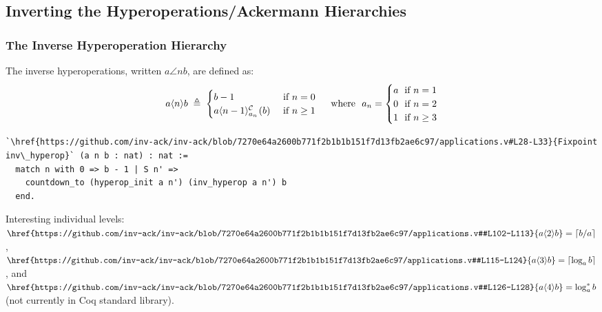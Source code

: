 \subsection{Inverting the Hyperoperations/Ackermann Hierarchies}
\begin{frame}[fragile]
\frametitle{The Inverse Hyperoperation Hierarchy}
The inverse hyperoperations, written $a\angle{n}b$, are defined as:
\begin{equation*}
a\angle{n}b \; \triangleq \; \begin{cases}
b - 1 & \text{ if } n = 0 \\
\cdt{a\angle{n-1}}{a_n}(b) & \text{ if } n \ge 1
\end{cases}
\quad \text{ where } \ a_n = \begin{cases}
a & \hspace{-7pt}\text{ if } n = 1 \\
0 & \hspace{-7pt}\text{ if } n = 2 \\
1 & \hspace{-7pt}\text{ if } n \ge 3
\end{cases}
\end{equation*}
\vspace{-1em}
\pause 
\begin{lstlisting}
`\href{https://github.com/inv-ack/inv-ack/blob/7270e64a2600b771f2b1b1b151f7d13fb2ae6c97/applications.v#L28-L33}{Fixpoint inv\_hyperop}` (a n b : nat) : nat :=
  match n with 0 => b - 1 | S n' =>
    countdown_to (hyperop_init a n') (inv_hyperop a n') b
  end.
\end{lstlisting}

\smallskip

\pause 
Interesting individual levels:
$\href{https://github.com/inv-ack/inv-ack/blob/7270e64a2600b771f2b1b1b151f7d13fb2ae6c97/applications.v#L102-L113}{a\angle{2}b}
= \left\lceil b/a \right\rceil$,
$\href{https://github.com/inv-ack/inv-ack/blob/7270e64a2600b771f2b1b1b151f7d13fb2ae6c97/applications.v#L115-L124}{a\angle{3}b}
= \left\lceil \log_a b \right\rceil$, and
$\href{https://github.com/inv-ack/inv-ack/blob/7270e64a2600b771f2b1b1b151f7d13fb2ae6c97/applications.v#L126-L128}{a\angle{4}b}
= \log^*_a b$ (not currently in Coq standard library).
\end{frame}



